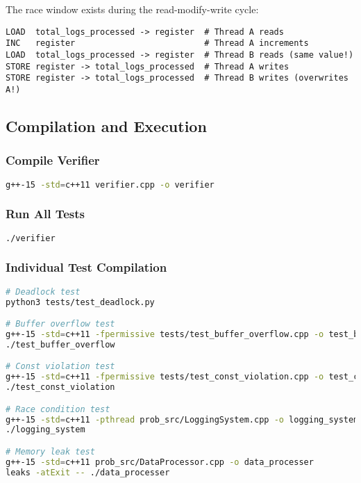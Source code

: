 \documentclass[11pt,a4paper]{article}
\begin{document}
The race window exists during the read-modify-write cycle:

\begin{verbatim}
LOAD  total_logs_processed -> register  # Thread A reads
INC   register                          # Thread A increments
LOAD  total_logs_processed -> register  # Thread B reads (same value!)
STORE register -> total_logs_processed  # Thread A writes
STORE register -> total_logs_processed  # Thread B writes (overwrites A!)
\end{verbatim}

\subsection{Compilation and Execution}

\subsubsection{Compile Verifier}
\begin{lstlisting}[language=bash]
g++-15 -std=c++11 verifier.cpp -o verifier
\end{lstlisting}

\subsubsection{Run All Tests}
\begin{lstlisting}[language=bash]
./verifier
\end{lstlisting}

\subsubsection{Individual Test Compilation}
\begin{lstlisting}[language=bash]
# Deadlock test
python3 tests/test_deadlock.py

# Buffer overflow test
g++-15 -std=c++11 -fpermissive tests/test_buffer_overflow.cpp -o test_buffer_overflow
./test_buffer_overflow

# Const violation test
g++-15 -std=c++11 -fpermissive tests/test_const_violation.cpp -o test_const_violation
./test_const_violation

# Race condition test
g++-15 -std=c++11 -pthread prob_src/LoggingSystem.cpp -o logging_system
./logging_system

# Memory leak test
g++-15 -std=c++11 prob_src/DataProcessor.cpp -o data_processer
leaks -atExit -- ./data_processer
\end{lstlisting}
\end{document}
